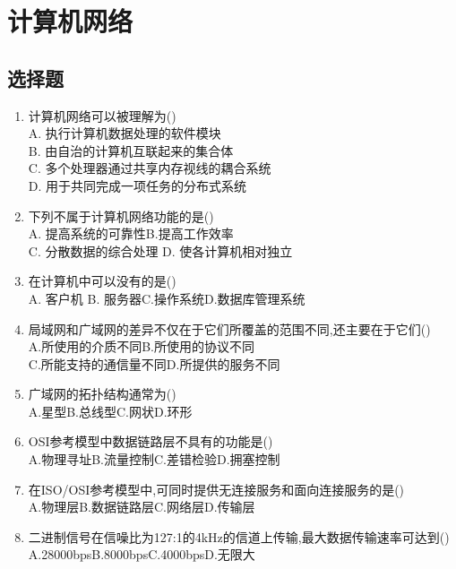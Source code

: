 \documentclass[12pt, a4paper, oneside, UTF8]{ctexbook}
\begin{document}
% 
\else
\fi
\chapter{计算机网络}
\section{选择题}
\begin{enumerate}
    \item 计算机网络可以被理解为() \\
    A. 执行计算机数据处理的软件模块 \\
    B. 由自治的计算机互联起来的集合体 \\
    C. 多个处理器通过共享内存视线的耦合系统 \\
    D. 用于共同完成一项任务的分布式系统 

    \item 下列不属于计算机网络功能的是() \\
    A. 提高系统的可靠性\qquad B.提高工作效率 \\
    C. 分散数据的综合处理 \qquad D. 使各计算机相对独立 


    \item 在计算机中可以没有的是() \\
    A. 客户机 \qquad B. 服务器\qquad C.操作系统\qquad D.数据库管理系统 


    \item 局域网和广域网的差异不仅在于它们所覆盖的范围不同,还主要在于它们() \\
    A.所使用的介质不同\qquad B.所使用的协议不同 \\
    C.所能支持的通信量不同\qquad D.所提供的服务不同

    \item 广域网的拓扑结构通常为() \\
    A.星型\qquad B.总线型\qquad C.网状\qquad D.环形


    \item \bl OSI参考模型中数据链路层不具有的功能是() \\
    A.物理寻址\qquad B.流量控制\qquad C.差错检验\qquad D.拥塞控制



    \item \bl 在ISO/OSI参考模型中,可同时提供无连接服务和面向连接服务的是() \\
    A.物理层\qquad B.数据链路层\qquad C.网络层\qquad D.传输层
    
    \item \bl[1] 二进制信号在信噪比为127:1的4kHz的信道上传输,最大数据传输速率可达到() \\
    A.28000bps\qquad B.8000bps\qquad C.4000bps\qquad D.无限大


\end{enumerate}
\end{document}
